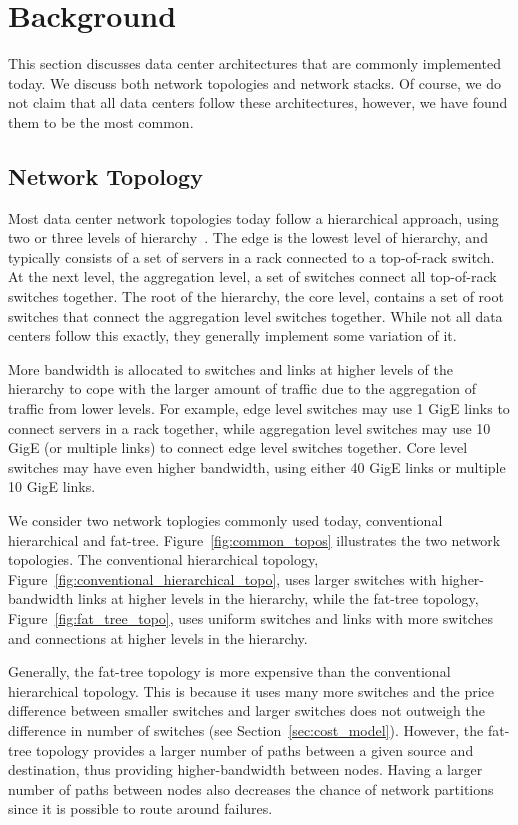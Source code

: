 \section{Background}
\label{sec:background}

This section discusses data center architectures that are commonly implemented today.  We discuss both network topologies and network stacks.  Of course, we do not claim that all data centers follow these architectures, however, we have found them to be the most common.

\subsection {Network Topology}

Most data center network topologies today follow a hierarchical approach, using two or three levels of hierarchy~\cite{Al-Fares:2008:SCD}.  The edge is the lowest level of hierarchy, and typically consists of a set of servers in a rack connected to a top-of-rack switch.  At the next level, the aggregation level, a set of switches connect all top-of-rack switches together.  The root of the hierarchy, the core level, contains a set of root switches that connect the aggregation level switches together.  While not all data centers follow this exactly, they generally implement some variation of it.

More bandwidth is allocated to switches and links at higher levels of the hierarchy to cope with the larger amount of traffic due to the aggregation of traffic from lower levels.  For example, edge level switches may use 1 GigE links to connect servers in a rack together, while aggregation level switches may use 10 GigE (or multiple links) to connect edge level switches together.  Core level switches may have even higher bandwidth, using either 40 GigE links or multiple 10 GigE links.

We consider two network toplogies commonly used today, conventional hierarchical and fat-tree.  Figure~\ref{fig:common_topos} illustrates the two network topologies.  The conventional hierarchical topology, Figure~\ref{fig:conventional_hierarchical_topo}, uses larger switches with higher-bandwidth links at higher levels in the hierarchy, while the fat-tree topology, Figure~\ref{fig:fat_tree_topo}, uses uniform switches and links with more switches and connections at higher levels in the hierarchy.

Generally, the fat-tree topology is more expensive than the conventional hierarchical topology.  This is because it uses many more switches and the price difference between smaller switches and larger switches does not outweigh the difference in number of switches (see Section~\ref{sec:cost_model}).  However, the fat-tree topology provides a larger number of paths between a given source and destination, thus providing higher-bandwidth between nodes.  Having a larger number of paths between nodes also decreases the chance of network partitions since it is possible to route around failures.

